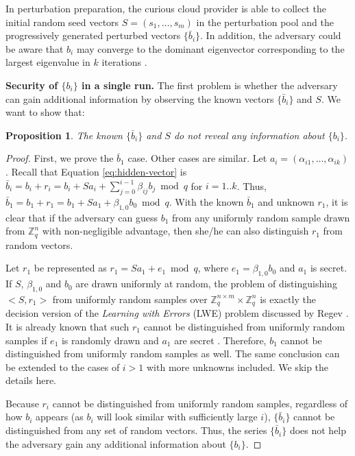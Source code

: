 \documentclass[10pt, conference, compsocconf]{IEEEtran}
\newtheorem{prop}[thm]{Proposition}
\begin{document}
In perturbation preparation, the curious cloud provider is able to collect the initial random seed vectors $S=(s_1,\ldots,s_m)$ in the perturbation pool and the progressively generated perturbed vectors $\{\bar{b}_i\}$. In addition, the adversary could be aware that $b_i$ may converge to the dominant eigenvector corresponding to the largest eigenvalue in $k$ iterations \cite{saad11}.

\textbf{Security of $\{b_i\}$ in a single run.} The first problem is whether the adversary can gain additional information by observing the known vectors $\{\bar{b}_i\}$ and $S$. We want to show that: 
\begin{prop}
The known $\{\bar{b}_i\}$ and $S$ do not reveal any information about $\{b_i\}$.   
\end{prop} 
\begin{proof}First, we prove the $\bar{b}_1$ case. Other cases are similar. 
Let $a_i =(\alpha_{i1},\ldots,\alpha_{ik})$. Recall that Equation \ref{eq:hidden-vector} is $\bar{b}_i =b_i+r_i= b_i + Sa_i + \sum_{j=0}^{i-1}\beta_{ij} b_j\bmod q$ for $i=1..k$. Thus, $\bar{b}_1= b_1+r_1 = b_1 + Sa_1 + \beta_{1,0}b_0 \bmod q$. With the known $\bar{b}_1$ and unknown $r_1$, it is clear that if the adversary can guess $b_1$ from any uniformly random sample drawn from $\mathbb{Z}_q^n$ with non-negligible advantage, then she/he can also distinguish $r_1$ from random vectors. 

Let $r_1$ be represented as $r_1=Sa_1 + e_1 \bmod q$, where $e_1=\beta_{1,0}b_0$ and $a_1$ is secret. If $S$, $\beta_{1,0}$ and $b_0$ are drawn uniformly at random, the problem of distinguishing $<S, r_1>$ from uniformly random samples over $\mathbb{Z}_q^{n\times m} \times  \mathbb{Z}_q^n$ is exactly the decision version of the \emph{Learning with Errors} (LWE) problem discussed by Regev \cite{regev05}. It is already known that such $r_1$ cannot be distinguished from uniformly random samples if $e_1$ is randomly drawn and $a_1$ are secret \cite{regev05}. Therefore, $b_1$ cannot be distinguished from uniformly random samples as well. The same conclusion can be extended to the cases of $i>1$ with more unknowns included. We skip the details here.

Because $r_i$ cannot be distinguished from uniformly random samples, regardless of how $b_i$ appears (as $b_i$ will look similar with sufficiently large $i$), $\{\bar{b}_i\}$ cannot be distinguished from any set of random vectors. Thus, the series $\{\bar{b}_i\}$ does not help the adversary gain any additional information about $\{b_i\}$.  
\end{proof} 
\end{document}
